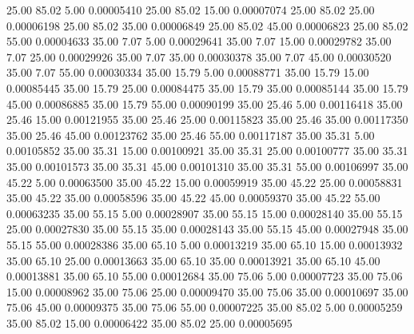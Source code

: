      25.00     85.02      5.00     0.00005410
     25.00     85.02     15.00     0.00007074
     25.00     85.02     25.00     0.00006198
     25.00     85.02     35.00     0.00006849
     25.00     85.02     45.00     0.00006823
     25.00     85.02     55.00     0.00004633
     35.00      7.07      5.00     0.00029641
     35.00      7.07     15.00     0.00029782
     35.00      7.07     25.00     0.00029926
     35.00      7.07     35.00     0.00030378
     35.00      7.07     45.00     0.00030520
     35.00      7.07     55.00     0.00030334
     35.00     15.79      5.00     0.00088771
     35.00     15.79     15.00     0.00085445
     35.00     15.79     25.00     0.00084475
     35.00     15.79     35.00     0.00085144
     35.00     15.79     45.00     0.00086885
     35.00     15.79     55.00     0.00090199
     35.00     25.46      5.00     0.00116418
     35.00     25.46     15.00     0.00121955
     35.00     25.46     25.00     0.00115823
     35.00     25.46     35.00     0.00117350
     35.00     25.46     45.00     0.00123762
     35.00     25.46     55.00     0.00117187
     35.00     35.31      5.00     0.00105852
     35.00     35.31     15.00     0.00100921
     35.00     35.31     25.00     0.00100777
     35.00     35.31     35.00     0.00101573
     35.00     35.31     45.00     0.00101310
     35.00     35.31     55.00     0.00106997
     35.00     45.22      5.00     0.00063500
     35.00     45.22     15.00     0.00059919
     35.00     45.22     25.00     0.00058831
     35.00     45.22     35.00     0.00058596
     35.00     45.22     45.00     0.00059370
     35.00     45.22     55.00     0.00063235
     35.00     55.15      5.00     0.00028907
     35.00     55.15     15.00     0.00028140
     35.00     55.15     25.00     0.00027830
     35.00     55.15     35.00     0.00028143
     35.00     55.15     45.00     0.00027948
     35.00     55.15     55.00     0.00028386
     35.00     65.10      5.00     0.00013219
     35.00     65.10     15.00     0.00013932
     35.00     65.10     25.00     0.00013663
     35.00     65.10     35.00     0.00013921
     35.00     65.10     45.00     0.00013881
     35.00     65.10     55.00     0.00012684
     35.00     75.06      5.00     0.00007723
     35.00     75.06     15.00     0.00008962
     35.00     75.06     25.00     0.00009470
     35.00     75.06     35.00     0.00010697
     35.00     75.06     45.00     0.00009375
     35.00     75.06     55.00     0.00007225
     35.00     85.02      5.00     0.00005259
     35.00     85.02     15.00     0.00006422
     35.00     85.02     25.00     0.00005695
